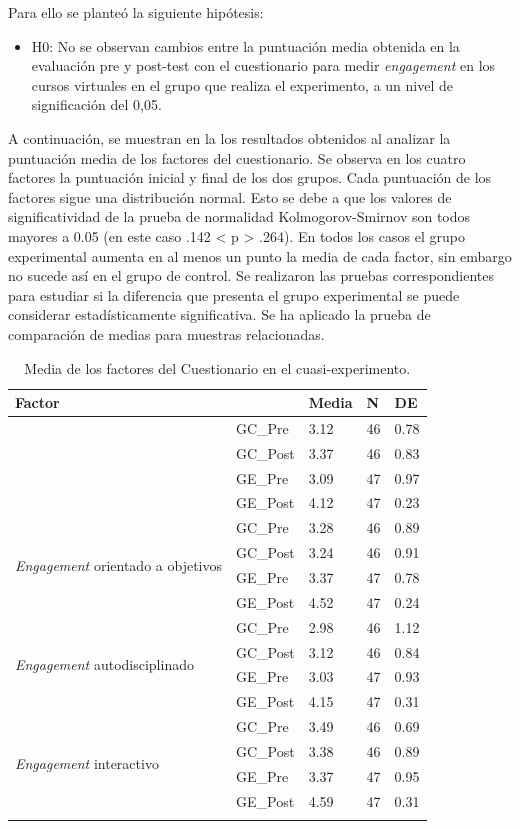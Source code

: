 \documentclass[spanish]{textolivre}
\begin{document}
Para ello se planteó la siguiente hipótesis:
\begin{itemize}
    \item H0: No se observan cambios entre la puntuación media obtenida en la evaluación pre y post-test con el cuestionario para medir \emph{engagement} en los cursos virtuales en el grupo que realiza el experimento, a un nivel de significación del 0,05.
\end{itemize}

A continuación, se muestran en la  los resultados obtenidos al analizar la puntuación media de los factores del cuestionario. Se observa en los cuatro factores la puntuación inicial y final de los dos grupos. Cada puntuación de los factores sigue una distribución normal. Esto se debe a que los valores de significatividad de la prueba de normalidad Kolmogorov-Smirnov son todos mayores a 0.05 (en este caso .142 < p > .264). En todos los casos el grupo experimental aumenta en al menos un punto la media de cada factor, sin embargo no sucede así en el grupo de control. Se realizaron las pruebas correspondientes para estudiar si la diferencia que presenta el grupo experimental se puede considerar estadísticamente significativa. Se ha aplicado la prueba de comparación de medias para muestras relacionadas.

\begin{table}[htbp]
\caption{Media de los factores del Cuestionario en el cuasi-experimento.}
\label{tab3}
\centering
\begin{tabular}{lllll}
\toprule
Factor &  & Media & N & DE \\ 
\midrule
\arrayrulecolor[gray]{.7}
\multirow{4}{*}{\emph{Engagement} aplicado} & GC\_Pre & 3.12 & 46 & 0.78 \\
 & GC\_Post & 3.37 & 46 & 0.83 \\
 \cmidrule{2-5}
 & GE\_Pre & 3.09 & 47 & 0.97 \\
 & GE\_Post & 4.12 & 47 & 0.23 \\
\midrule
\multirow{4}{*}{\emph{Engagement} orientado a objetivos} & GC\_Pre & 3.28 & 46 & 0.89 \\
 & GC\_Post & 3.24 & 46 & 0.91 \\
 \cmidrule{2-5}
 & GE\_Pre & 3.37 & 47 & 0.78 \\
 & GE\_Post & 4.52 & 47 & 0.24 \\
\midrule
\multirow{4}{*}{\emph{Engagement} autodisciplinado} & GC\_Pre & 2.98 & 46 & 1.12 \\
 & GC\_Post & 3.12 & 46 & 0.84 \\
 \cmidrule{2-5}
 & GE\_Pre & 3.03 & 47 & 0.93 \\
 & GE\_Post & 4.15 & 47 & 0.31 \\
\midrule
\multirow{4}{*}{\emph{Engagement} interactivo} & GC\_Pre & 3.49 & 46 & 0.69 \\
 & GC\_Post & 3.38 & 46 & 0.89 \\
 \cmidrule{2-5}
 & GE\_Pre & 3.37 & 47 & 0.95 \\
 & GE\_Post & 4.59 & 47 & 0.31 \\
\arrayrulecolor{black}
\bottomrule
\end{tabular}
\end{table}
\end{document}
